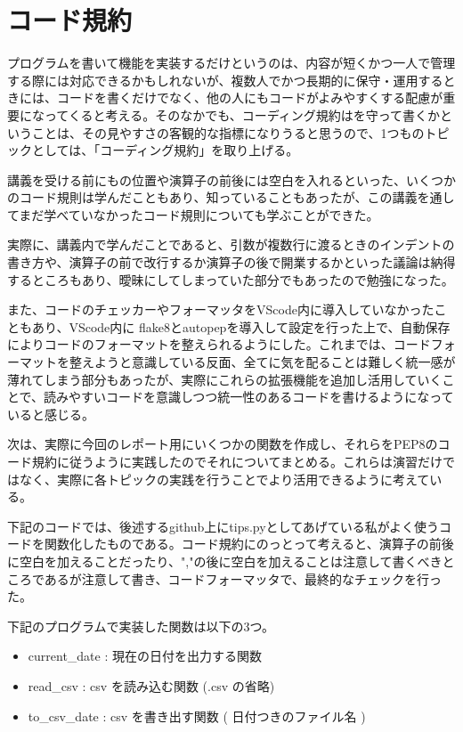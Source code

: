 \documentclass[12pt]{jsarticle}
\begin{document}
\section{コード規約}
プログラムを書いて機能を実装するだけというのは、内容が短くかつ一人で管理する際には対応できるかもしれないが、複数人でかつ長期的に保守・運用するときには、コードを書くだけでなく、他の人にもコードがよみやすくする配慮が重要になってくると考える。そのなかでも、コーディング規約はを守って書くかということは、その見やすさの客観的な指標になりうると思うので、1つものトピックとしては、「コーディング規約」を取り上げる。

講義を受ける前にも{}の位置や演算子の前後には空白を入れるといった、いくつかのコード規則は学んだこともあり、知っていることもあったが、この講義を通してまだ学べていなかったコード規則についても学ぶことができた。

実際に、講義内で学んだことであると、引数が複数行に渡るときのインデントの書き方や、演算子の前で改行するか演算子の後で開業するかといった議論は納得するところもあり、曖昧にしてしまっていた部分でもあったので勉強になった。

また、コードのチェッカーやフォーマッタをVScode内に導入していなかったこともあり、VScode内に flake8とautopepを導入して設定を行った上で、自動保存によりコードのフォーマットを整えられるようにした。これまでは、コードフォーマットを整えようと意識している反面、全てに気を配ることは難しく統一感が薄れてしまう部分もあったが、実際にこれらの拡張機能を追加し活用していくことで、読みやすいコードを意識しつつ統一性のあるコードを書けるようになっていると感じる。

次は、実際に今回のレポート用にいくつかの関数を作成し、それらをPEP8のコード規約に従うように実践したのでそれについてまとめる。これらは演習だけではなく、実際に各トピックの実践を行うことでより活用できるように考えている。

下記のコードでは、後述するgithub上にtips.pyとしてあげている私がよく使うコードを関数化したものである。コード規約にのっとって考えると、演算子の前後に空白を加えることだったり、","の後に空白を加えることは注意して書くべきところであるが注意して書き、コードフォーマッタで、最終的なチェックを行った。

下記のプログラムで実装した関数は以下の3つ。
\begin{itemize}
  \item current\_date : 現在の日付を出力する関数
  \item read\_csv     : csv を読み込む関数 (.csv の省略)
  \item to\_csv\_date  : csv を書き出す関数 ( 日付つきのファイル名 )
\end{itemize}
\end{document}
